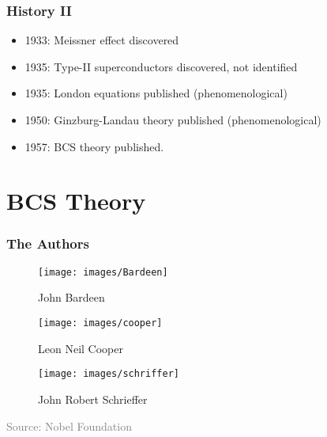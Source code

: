 \documentclass{beamer}
\begin{document}
		\begin{frame}
			\frametitle{History II}
			\begin{itemize}
				\item 1933: Meissner effect discovered \cite{e_brit}
				\item 1935: Type-II superconductors discovered, not identified \cite{RJABININ1935}
				\item 1935: London equations published (phenomenological) \cite{london}
				\item 1950: Ginzburg-Landau theory published (phenomenological) \cite{ginz_land}
				\item 1957: BCS theory published. %
			\end{itemize}
		\end{frame}
	
	\section{BCS Theory}
		\begin{frame}
			\frametitle{The Authors}
			\begin{multicols}{3}
				\begin{figure}
					\centering
					\texttt{[image: images/Bardeen]}
					\caption[]{John Bardeen}
					\label{fig:bardeen}
				\end{figure}
			\columnbreak	
				\begin{figure}
					\centering
					\texttt{[image: images/cooper]}
					\caption[]{Leon Neil Cooper}
					\label{fig:cooper}
				\end{figure}
			\columnbreak
				\begin{figure}
					\centering
					\texttt{[image: images/schriffer]}
					\caption[]{John Robert Schrieffer}
					\label{fig:schriffer}
				\end{figure}
			\end{multicols}
		\tiny \textcolor{gray}{Source: Nobel Foundation}
		\end{frame}
\end{document}
